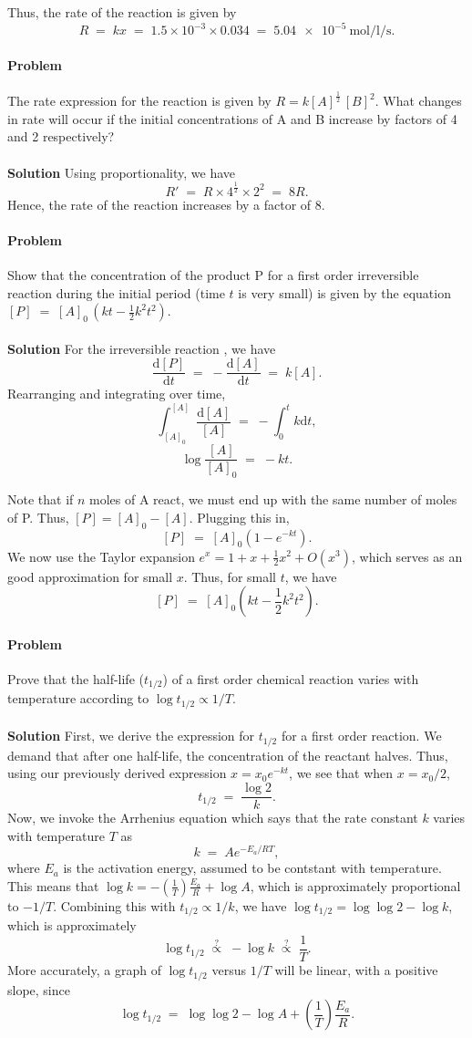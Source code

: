 \documentclass[10pt]{article}
\newcounter{prob}
\def\problem{\stepcounter{prob}\paragraph{Problem \arabic{prob}}}
\def\solution{\\\\\textbf{Solution }}
\begin{document}
        Thus, the rate of the reaction is given by
        \[
                R \;=\; k x \;=\; 1.5\times 10^{-3} \times 0.034 \;=\; \SI{5.04e-5}{\mole\per\litre\per\s}.
        \]

        \problem The rate expression for the reaction  is given by $R = k [A]^{\frac{1}{2}}\, [B]^{2}$.
        What changes in rate will occur if the initial concentrations of A and B increase by factors of 4 and 2 respectively?
        \solution Using proportionality, we have
        \[R' \;=\; R \times 4^{\frac{1}{2}} \times 2^{2} \;=\; 8R.\]
        Hence, the rate of the reaction increases by a factor of 8.

        \problem Show that the concentration of the product P for a first order irreversible reaction during the initial period (time $t$ is very small)
        is given by the equation $[P] \;=\; [A]_0\, (kt - \frac{1}{2}k^2t^2)$.
        \solution For the irreversible reaction , we have
        \[
        \frac{\mathrm{d} [P]}{\mathrm{d}t} \;=\; -\frac{\mathrm{d} [A]}{\mathrm{d}t} \;=\; k[A].
        \]
        Rearranging and integrating over time,
        \[
        \int_{[A]_0}^{[A]} \frac{\mathrm{d}{[A]}}{[A]} \;=\; - \int_0^t k \mathrm{d}{t},   
        \]
        \[
        \log\frac{[A]}{[A]_0} \;=\; -kt.
        \]

        Note that if $n$ moles of A react, we must end up with the same number of moles of P. Thus, $[P] = [A]_0 - [A]$.
        Plugging this in,
        \[
        [P] \;=\; [A]_0 (1 - e^{-kt}).
        \]
        We now use the Taylor expansion $e^x = 1 + x + \frac{1}{2}x^2 + O(x^3)$, which serves as an good approximation for small $x$.
        Thus, for small $t$, we have
        \[
        [P] \;=\; [A]_0 \left(kt - \frac{1}{2}k^2t^2 \right).
        \]

        \problem Prove that the half-life ($t_{1/2}$) of a first order chemical reaction varies with temperature according to $\log{t_{1/2}} \propto 1 /T$.
        \solution First, we derive the expression for $t_{1 /2}$ for a first order reaction. We demand that after one half-life,
        the concentration of the reactant halves. Thus, using our previously derived expression $x = x_0 e^{-kt}$, we see that
        when $x = x_0 / 2$,
        \[t_{1 /2} \;=\; \frac{\log{2}}{k}.\]
        Now, we invoke the Arrhenius equation which says that the rate constant $k$ varies with temperature $T$ as
        \[k \;=\; A e^{-E_a /RT},\]
        where $E_a$ is the activation energy, assumed to be contstant with temperature.
        This means that $\log{k} = -\left(\frac{1}{T}\right)\frac{E_a}{R} + \log{A}$, which is approximately proportional to $-1 /T$.
        Combining this with $t_{1 /2} \propto 1 / k$, we have $\log{t_{1 / 2}} = \log\log{2} - \log{k}$, which is approximately
        \[
        \log{t_{1 /2}} \;\stackrel{?}{\propto}\; -\log{k} \;\stackrel{?}{\propto}\; \frac{1}{T}.
        \]
        More accurately, a graph of $\log{t_{1 /2}}$ versus $1 /T$ will be linear, with a positive slope,
        since
        \[
        \log{t_{1 /2}} \;=\; \log\log{2} - \log{A} + \left( \frac{1}{T}  \right)\frac{E_a}{R}.
        \]
\end{document}
